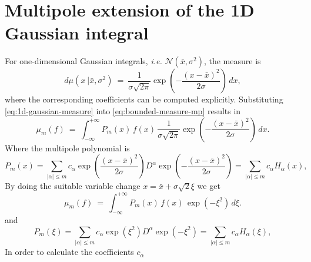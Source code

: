 \documentclass[11pt,a4paper]{article}
\begin{document}
 \section{Multipole extension of the 1D Gaussian integral}
 For one-dimensional Gaussian integrals, {\it i.e.} $\mathcal{N}(\bar{x} ,\sigma^{2})$, the measure is
 \begin{equation} \label{eq:1d-gaussian-measure}
 d\mu(x\ | \bar{x} ,\sigma^{2})\ =\ \frac{1}{\sigma\sqrt{2\pi}} \exp \left(-\frac{(x - \bar{x})^2}{2\sigma} \right) \, dx, 
 \end{equation}
where the corresponding coefficients can be computed explicitly. Substituting \cref{eq:1d-gaussian-measure} into 
 \cref{eq:bounded-measure-mp} results in 
 \begin{equation} \label{eq:eq:bounded-measure-mp-gaussian-1D}
    \mu_m(f)\ =\ \int_{-\infty}^{+\infty} P_m(x) \, f(x) \, \frac{1}{\sigma\sqrt{2\pi}} \exp \left(-\frac{(x - \bar{x})^2}{2\sigma} \right) \, dx.
 \end{equation}
 Where the multipole polynomial is
 \begin{equation}
    \label{eq:multipole-expansion-polynomial-III}
        P_m(x)
        =
        \sum_{|\alpha|\leq m}
        c_\alpha
        \exp\left( \frac{(x - \bar{x})^2}{2\sigma} \right)
        D^\alpha
        \exp\left( - \frac{(x - \bar{x})^2}{2\sigma} \right)
        =
        \sum_{|\alpha|\leq m}
        c_\alpha
        H_\alpha(x),
\end{equation}
 By doing the suitable variable change $x = \bar{x} + \sigma\sqrt{2}\xi$ we get
 \begin{equation} \label{eq:eq:bounded-measure-mp-gaussian-1D-II}
    \mu_m(f)\ =\ \int_{-\infty}^{+\infty} P_m(x) \, f(x) \, \exp \left(- \xi^2 \right) \, d\xi.
 \end{equation}
 and
 \begin{equation}
    \label{eq:multipole-expansion-polynomial-IV}
        P_m(\xi)
        =
        \sum_{|\alpha|\leq m}
        c_\alpha
        \exp\left( \xi^2 \right)
        D^\alpha
        \exp\left( - \xi^2 \right)
        =
        \sum_{|\alpha|\leq m}
        c_\alpha
        H_\alpha(\xi),
\end{equation}
In order to calculate the coefficients $c_\alpha$
\end{document}
